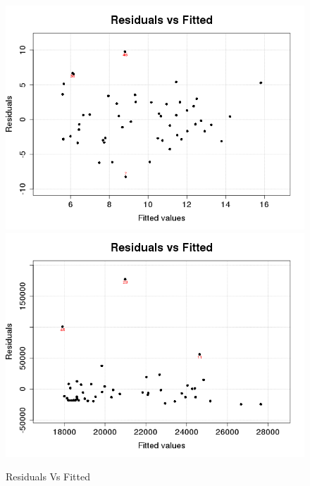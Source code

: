 \begin{figure}[p]
\begin{center}
    \includegraphics[scale=0.4]{imgOT/model1-drawResidualsVsFitted.png}\hspace*{1cm}
	\includegraphics[scale=0.4]{imgOT/model2-drawResidualsVsFitted.png}\\
  \end{center}
  \caption{Residuals Vs Fitted}
\end{figure}

